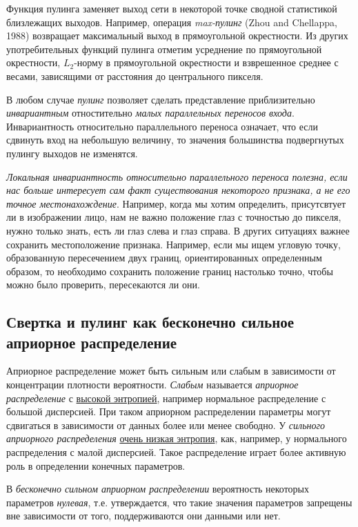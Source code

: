 \documentclass[%
	11pt,
	a4paper,
	utf8,
]{article}
\begin{document}
Функция пулинга заменяет выход сети в некоторой точке сводной статистикой близлежащих выходов. Например, операция \emph{max-пулинг} (Zhou and Chellappa, 1988) возвращает максимальный выход в прямоугольной окрестности. Из других употребительных функций пулинга отметим усреднение по прямоугольной окрестности, $ L_2 $-норму в прямоугольной окрестности и взврешенное среднее с весами, зависящими от расстояния до центрального пикселя.

{\color{blue}В любом случае \emph{пулинг} позволяет сделать представление приблизительно \emph{инвариантным} отностительно \emph{малых параллельных переносов входа}}. Инвариантность относительно параллельного переноса означает, что если сдвинуть вход на небольшую величину, то значения большинства подвергнутых пулингу выходов не изменятся.

\emph{{\color{blue}Локальная инвариантность} относительно параллельного переноса полезна, если нас больше интересует сам {\color{blue}факт существования} некоторого \emph{признака}, а не его точное местонахождение}. Например, когда мы хотим определить, присутсвтует ли в изображении лицо, нам не важно положение глаз с точностью до пикселя, нужно только знать, есть ли глаз слева и глаз справа. В других ситуациях важнее сохранить местоположение признака. Например, если мы ищем угловую точку, образованную пересечением двух границ, ориентированных определенным образом, то необходимо сохранить положение границ настолько точно, чтобы можно было проверить, пересекаются ли они.

\subsection{Свертка и пулинг как бесконечно сильное априорное распределение}

Априорное распределение может быть сильным или слабым в зависимости от концентрации плотности вероятности. \emph{Слабым} называется \emph{априорное распределение} с \underline{высокой энтропией}, например нормальное распределение с большой дисперсией. При таком априорном распределении параметры могут сдвигаться в зависимости  от данных более или менее свободно. У \emph{сильного априорного распределения} \underline{очень низкая энтропия}, как, например, у нормального распределения с малой дисперсией. Такое распределение играет более активную роль в определении конечных параметров.

В \emph{бесконечно сильном априорном распределении} вероятность некоторых параметров \emph{нулевая}, т.е. утверждается, что такие значения параметров запрещены вне зависимости от того, поддерживаются они данными или нет.
\end{document}
